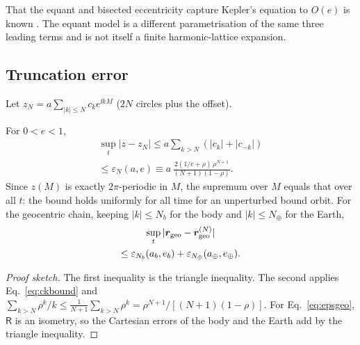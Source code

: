 That the equant and bisected eccentricity capture Kepler's equation to
$O(e)$ is known \cite{Evans1984,Evans1988,CarmanRecio2019,Rushkin2015}. The equant model
is a different parametrisation of the same three leading terms and is not
itself a finite harmonic-lattice expansion.

\subsection{Truncation error}
\label{sec:th-trunc}

Let $z_N=a\sum_{|k|\le N}c_ke^{\ii kM}$ ($2N$ circles plus the offset).

\begin{theorem}
\label{thm:trunc}
For $0<e<1$,
\begin{multline}
\sup_t|z-z_N|\le a\sum_{k>N}(|c_k|+|c_{-k}|)\\
\le\varepsilon_N(a,e)\equiv
a\,\frac{2(1/e+\rho)\,\rho^{N+1}}{(N+1)(1-\rho)} .
\label{eq:eps}
\end{multline}
Since $z(M)$ is exactly $2\pi$-periodic in $M$, the supremum over $M$ equals
that over all $t$: the bound holds uniformly for all time for an unperturbed
bound orbit. For the geocentric chain, keeping $|k|\le N_b$ for the body and
$|k|\le N_\oplus$ for the Earth,
\begin{multline}
\sup_t|\bm{r}_{\mathrm{geo}}-\bm{r}_{\mathrm{geo}}^{(N)}|\\\le\varepsilon_{N_b}(a_b,e_b)+\varepsilon_{N_\oplus}(a_\oplus,e_\oplus).
\label{eq:epsgeo}
\end{multline}
\end{theorem}
\begin{proof}[Proof sketch]
The first inequality is the triangle inequality. The second applies
Eq.~\eqref{eq:ckbound} and $\sum_{k>N}\rho^k/k\le\frac1{N+1}\sum_{k>N}\rho^k
=\rho^{N+1}/[(N+1)(1-\rho)]$. For Eq.~\eqref{eq:epsgeo}, $\mathsf R$ is an
isometry, so the Cartesian errors of the body and the Earth add by the
triangle inequality.
\end{proof}

